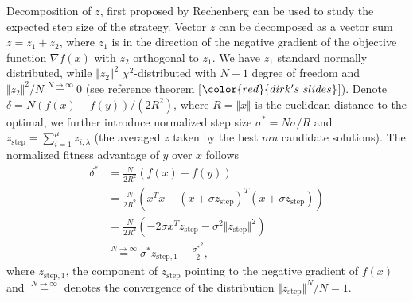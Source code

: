 
Decomposition of $z$, first proposed by Rechenberg \cite{rechenberg1973evolutionsstrategie} can be used to study the expected step size of the strategy. Vector $z$ can be decomposed as a vector sum $z = z_1 + z_2$, where $z_1$ is in the direction of the negative gradient of the objective function $\nabla f(x)$ with $z_2$ orthogonal to $z_1$. We have $z_1$ standard normally distributed, while $\Vert z_2\Vert^2$ $\chi^2$-distributed with $N-1$ degree of freedom and $ \Vert z_2\Vert^2 /N \overset{N \rightarrow \infty }{=} 0$ (see reference theorem [$\color{red}{dirk's\ slides }$]). Denote $\delta = N (f(x) - f(y))/(2R^2)$, where $R = \Vert x \Vert$ is the euclidean distance to the optimal, we further introduce normalized step size $\sigma^* = N \sigma/R$ and $z_{\text{step}} = \sum_{i=1}^\mu z_{i;\lambda}$ (the averaged $z$ taken by the best $mu$ candidate solutions). The normalized fitness advantage of $y$ over $x$ follows
\begin{align}{}
\delta^* & = \frac{N}{2R^2}\left( f(x) - f(y)\right)  \nonumber\\
& = \frac{N}{2R^2} (x^Tx - (x+\sigma z_{\text{step}})^T (x+\sigma z_{\text{step}})) \nonumber\\
& = \frac{N}{2R^2} (-2 \sigma x^Tz_{\text{step}} - \sigma^2 \Vert z_{\text{step}}\Vert^2 ) \nonumber\\
& \overset{N \rightarrow \infty}{=} \sigma^* z_{\text{step},1} - \frac{{\sigma^*} ^2}{2} \label{eqn:delta}{},
\end{align}
where $z_{\text{step},1} $, the component of $z_{\text{step}}$ pointing to the negative gradient of $f(x)$ and $\overset{ N \rightarrow \infty}{=}$ denotes the convergence of the distribution $\Vert z_{\text{step} } \Vert^N/N = 1$. 

